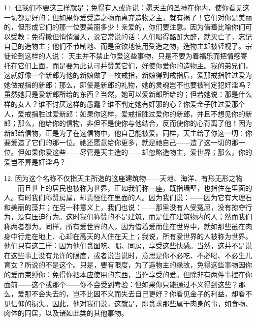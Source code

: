 11. 但我们不要这三样就是；免得有人或许说：愿天主的圣神在你内，使你看见这一切都是好的；但如果你爱受造之物而离弃造物之主，就有祸了！它们对你是美丽的，但形成它们的那一位要美丽多少！亲爱的，你们要注意。因为借着比喻你们可以受教：免得撒但悄悄潜入，说它常说的话：人们喝得酩酊大醉，就灭亡了，忘记自己的造物主；他们不节制地、而是贪欲地使用受造之物，造物主却被轻视了。宗徒论到这样的人说： 天主并不禁止你爱这些事物，只是不要为着福乐而把情感寄托在它们上面，而是要为此认可并赞美它们，好使你爱你的造物主。我的弟兄们，这就好像一个新郎为他的新娘做了一枚戒指，新娘得到戒指后，爱那戒指胜过爱为她做戒指的新郎：那么，即使是新郎的礼物，她的灵魂岂不也要被判定犯奸淫吗？虽然她只是爱新郎所给的东西？当然，她可以爱新郎所给的；但若她说：那是什么样的女人？谁不讨厌这样的愚蠢？谁不判定她有奸邪的心？你爱金子胜过爱那个人，爱戒指胜过爱新郎：如果你这样，爱戒指胜过爱你的新郎，并且不想见你的新郎；那么，他给你的信物，非但不是使你与他结合，反而使你的心背离了他！因为新郎给信物，正是为了在这信物中，他自己能被爱。同样，天主给了你这一切：你要爱造了它们的那一位。祂还愿意给你更多，就是祂自己——造了这一切的那一位。但如果你爱这些——尽管是天主造的——却忽略造物主，爱世界；那么，你的爱岂不算是奸淫吗？\par

12. 因为这个名称不仅指天主所造的这座建筑物——天地、海洋、有形无形之物——而且世上的居民也被称为世界，正如我们称一座，既指墙壁，也指住在里面的人。有时我们称赞房屋，却责怪住在里面的人。因为我们说：——因为它有大理石和美丽的藻井；在另一种意义上，我们也说：——那里没有人受冤屈，没有掠夺行为，没有压迫行为。这时我们称赞的不是建筑，而是住在建筑物内的人；然而我们称两者都为。同样，所有爱世界的人，因为借着爱而住在世界中，就如那些虽在肉身中行走在地上、心却在高天的人住在天上；我说，所有爱世界的人被称为世界。他们只有这三样：因为他们贪图吃、喝、同房，享受这些快感。当然，这并不是说在这些事上没有允许的限度，或者说当说时，意思是你不必吃、不必喝、不必生儿育女？所说的不是这个。只是，要有限度，为了造物主的缘故，免得这些事物因你的爱而束缚你：免得你把本应使用的东西，当作享受的爱。但除非有两件事摆在你面前——这个或那个——你不会受到考验：但如果你只能通过不义得到这些？那么，爱那不会失去的，岂不比因不义而失去自己更好？你看见金子的利益，却看不见信仰的损失。因此，他对我们说，这就是，即贪求那些属于肉身的事，如食物、肉体的同居，以及诸如此类的其他事物。\par

